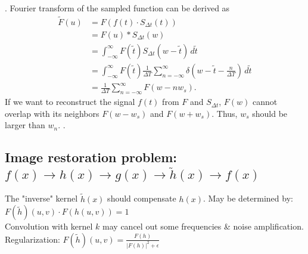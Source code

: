  . Fourier transform of the sampled function can be derived as
\begin{align*}
    \tilde{F}(u) &= F(f(t) \cdot S_{\Delta t}(t)) \\
                 &= F(u) * S_{\Delta t}(w) \\
                 &= \int_{-\infty}^{\infty} F(\tilde{t}) S_{\Delta t}(w - \tilde{t}) \, d\tilde{t} \\
                 &= \int_{-\infty}^{\infty} F(\tilde{t}) \frac{1}{\Delta T} \sum_{n = -\infty}^{\infty} \delta (w - \tilde{t} - \frac{n}{\Delta T}) \, d\tilde{t} \\
                 &= \frac{1}{\Delta T} \sum_{n = -\infty}^{\infty} F(w - n w_s).
\end{align*}
If we want to reconstruct the signal $f(t)$ from $F$ and $S_{\Delta t}$, $F(w)$ cannot overlap with its neighbors $F(w - w_s)$ and $F(w + w_s)$. Thus, $w_s$ should be larger than $w_n$. .
\subsection*{Image restoration problem: $f(x) \rightarrow h(x) \rightarrow g(x) \rightarrow \tilde{h}(x) \rightarrow f(x)$}
The "inverse" kernel $\tilde{h}(x)$ should compensate $h(x)$. May be determined by: $F(\tilde{h})(u, v) \cdot F(h(u, v)) = 1$\\
 Convolution with kernel $k$ may cancel out some frequencies \& noise amplification. \\
 Regularization: $F(\tilde{h})(u, v) = \frac{F(h)}{{|F(h)|}^{2} + \epsilon}$ 
